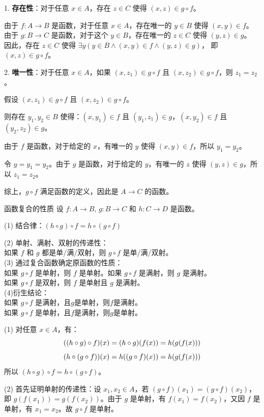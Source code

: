 \documentclass[lang=cn,11pt]{elegantbook}
\begin{document}
1. \textbf{存在性}：对于任意 $x \in A$，存在 $z \in C$ 使得 $(x,z) \in g \circ f$。

由于 $f: A \to B$ 是函数，对于任意 $x \in A$，存在唯一的 $y \in B$ 使得 $(x,y) \in f$。
由于 $g: B \to C$ 是函数，对于这个 $y \in B$，存在唯一的 $z \in C$ 使得 $(y,z) \in g$。
因此，存在 $z \in C$ 使得 $\exists y (y \in B \land (x,y) \in f \land (y,z) \in g)$，
即 $(x,z) \in g \circ f$。

2. \textbf{唯一性}：对于任意 $x \in A$，如果 $(x,z_1) \in g \circ f$ 且 $(x,z_2) \in g \circ f$，则 $z_1 = z_2$。

假设 $(x,z_1) \in g \circ f$ 且 $(x,z_2) \in g \circ f$。

则存在 $y_1, y_2 \in B$ 使得：$(x,y_1) \in f$ 且 $(y_1,z_1) \in g$，$(x,y_2) \in f$ 且 $(y_2,z_2) \in g$。

由于 $f$ 是函数，对于给定的 $x$，有唯一的 $y$ 使得 $(x,y) \in f$，所以 $y_1 = y_2$。

令 $y = y_1 = y_2$。由于 $g$ 是函数，对于给定的 $y$，有唯一的 $z$ 使得 $(y,z) \in g$，所以 $z_1 = z_2$。

综上，$g \circ f$ 满足函数的定义，因此是 $A \to C$ 的函数。
\begin{theorem}{函数复合的性质}
设 $f: A \to B$, $g: B \to C$ 和 $h: C \to D$ 是函数。

(1) 结合律：$(h \circ g) \circ f = h \circ (g \circ f)$

(2) 单射、满射、双射的传递性：\\
如果 $f$ 和 $g$ 都是单/满/双射，则 $g \circ f$ 是单/满/双射。\\
(3) 通过复合函数确定原函数的性质：\\
如果 $g \circ f$ 是单射，则 $f$ 是单射。如果 $g \circ f$ 是满射，则 $g$ 是满射。\\
如果 $g \circ f$ 是双射，则 $f$ 是单射且 $g$ 是满射。\\
(4)衍生结论：\\
如果 $g \circ f$ 是满射，且$g$是单射，则$f$是满射。 \\
如果 $g \circ f$ 是单射，且$f$是满射，则$g$是单射。
\end{theorem}
(1) 对任意 $x \in A$，有：\vspace{-10pt}
\[
((h \circ g) \circ f)(x) = (h \circ g)(f(x)) = h(g(f(x)))\vspace{-10pt}
\]
\[
(h \circ (g \circ f))(x) = h((g \circ f)(x)) = h(g(f(x)))\vspace{-10pt}
\]
所以 $(h \circ g) \circ f = h \circ (g \circ f)$。

(2) 首先证明单射的传递性：设 $x_1, x_2 \in A$，若 $(g \circ f)(x_1) = (g \circ f)(x_2)$，即 $g(f(x_1)) = g(f(x_2))$。由于 $g$ 是单射，有 $f(x_1) = f(x_2)$，又因 $f$ 是单射，有 $x_1 = x_2$。故 $g \circ f$ 是单射。
\end{document}
